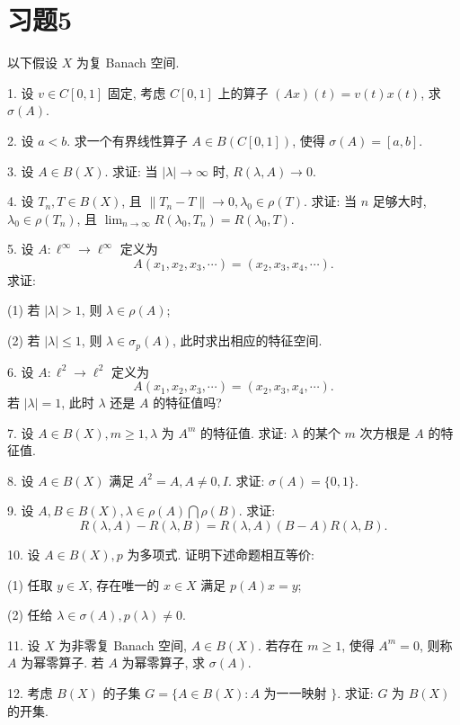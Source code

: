 \documentclass[openany]{ctexbook}
\theoremstyle{kaiti}
\theoremstyle{normal}
\begin{document}
\section*{习题5}

以下假设 $X$ 为复 Banach 空间.

1. 设 $v \in C[0,1]$ 固定, 考虑 $C[0,1]$ 上的算子 $(A x)(t)=v(t) x(t)$, 求 $\sigma(A)$.

2. 设 $a<b$. 求一个有界线性算子 $A \in B(C[0,1])$, 使得 $\sigma(A)=[a, b]$.

3. 设 $A \in B(X)$. 求证: 当 $|\lambda| \rightarrow \infty$ 时, $R(\lambda, A) \rightarrow 0$.

4. 设 $T_n, T \in B(X)$, 且 $\left\|T_n-T\right\| \rightarrow 0, \lambda_0 \in \rho(T)$. 求证: 当 $n$ 足够大时, $\lambda_0 \in \rho\left(T_n\right)$, 且 $\lim_{n \rightarrow \infty} R\left(\lambda_0, T_n\right)=R\left(\lambda_0, T\right).$

5. 设 $A: \ell^{\infty} \rightarrow \ell^{\infty}$ 定义为
$$
A\left(x_1, x_2, x_3, \cdots\right)=\left(x_2, x_3, x_4, \cdots\right).
$$
求证:

(1) 若 $|\lambda|>1$, 则 $\lambda \in \rho(A)$;

(2) 若 $|\lambda| \leqslant 1$, 则 $\lambda \in \sigma_{p}(A)$, 此时求出相应的特征空间.

6. 设 $A: \ell^2 \rightarrow \ell^2$ 定义为
$$
A\left(x_1, x_2, x_3, \cdots\right)=\left(x_2, x_3, x_4, \cdots\right).
$$
若 $|\lambda|=1$, 此时 $\lambda$ 还是 $A$ 的特征值吗?

7. 设 $A \in B(X), m \geqslant 1, \lambda$ 为 $A^m$ 的特征值. 求证: $\lambda$ 的某个 $m$ 次方根是 $A$ 的特征值.

8. 设 $A \in B(X)$ 满足 $A^2=A, A \neq 0, I$. 求证: $\sigma(A)=\{0,1\}$.

9. 设 $A, B \in B(X), \lambda \in \rho(A) \bigcap \rho(B)$. 求证:
$$
R(\lambda, A)-R(\lambda, B)=R(\lambda, A)(B-A) R(\lambda, B).
$$

10. 设 $A \in B(X), p$ 为多项式. 证明下述命题相互等价:

(1) 任取 $y \in X$, 存在唯一的 $x \in X$ 满足 $p(A) x=y$;

(2) 任给 $\lambda \in \sigma(A), p(\lambda) \neq 0$.

11. 设 $X$ 为非零复 Banach 空间, $A \in B(X)$. 若存在 $m \geqslant 1$, 使得 $A^m=0$, 则称 $A$ 为幂零算子. 若 $A$ 为幂零算子, 求 $\sigma(A)$.

12. 考虑 $B(X)$ 的子集 $G=\{A \in B(X): A$ 为一一映射 $\}$. 求证: $G$ 为 $B(X)$ 的开集.
\end{document}
